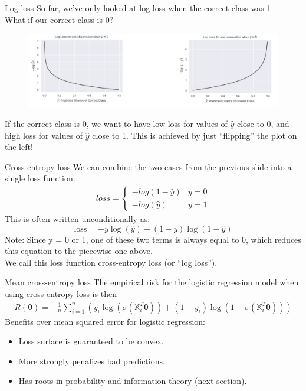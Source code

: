 \documentclass[aspectratio=169]{../latex_main/tntbeamer}  %
\begin{document}
	\begin{frame}{Log loss}
	    So far, we’ve only looked at log loss when the correct class was 1. \\
	    What if our correct class is 0?
        \begin{figure}
            \centering
            \includegraphics[scale=.33]{Bild20}
        \end{figure}
	    If the correct class is 0, we want to have low loss for values of   $\hat{y}$   close to 0, and high loss for values of   $\hat{y}$    close to 1. This is achieved by just “flipping” the plot on the left!
	\end{frame}
	
	
	\begin{frame}{Cross-entropy loss}
	    We can combine the two cases from the previous slide into a single loss function:
	    \begin{align*}
	        loss = \left\{\begin{array}{cc}
	            -log(1 - \hat{y}) & y = 0  \\
	            -log(\hat{y}) & y= 1 
	        \end{array}\right.
	    \end{align*}
	    This is often written unconditionally as:
	    \begin{equation*}
	        \text{loss} = -y\log (\hat{y}) - (1 - y) \log (1 - \hat{y})
	    \end{equation*}
	    Note: Since y = 0 or 1, one of these two terms is always equal to 0, which reduces this equation to the piecewise one above.\\
	    \bigskip
	    We call this loss function cross-entropy loss (or “log loss”).
	\end{frame}
	
	\begin{frame}{Mean cross-entropy loss}
	    The empirical risk for the logistic regression model when using cross-entropy loss is then
	    \begin{align*}
	        R(\bm{\theta}) = -\frac{1}{n}\sum\limits_{i=1}^n(y_i\log (\sigma (\mathbb{X}_i^T\bm{\theta})) + (1 - y_i)\log (1 - \sigma (\mathbb{X}_i^T\bm{\theta})))
	    \end{align*}
	    Benefits over mean squared error for logistic regression:
	    \begin{itemize}
	        \item Loss surface is guaranteed to be convex.
	        \item More strongly penalizes bad predictions.
	        \item Has roots in probability and information theory (next section).
	    \end{itemize}
	\end{frame}
	
\end{document}
